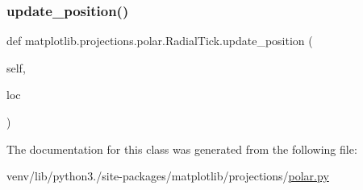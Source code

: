 \subsubsection{\texorpdfstring{update\+\_\+position()}{update\_position()}}
{\footnotesize\ttfamily def matplotlib.\+projections.\+polar.\+Radial\+Tick.\+update\+\_\+position (\begin{DoxyParamCaption}\item[{}]{self,  }\item[{}]{loc }\end{DoxyParamCaption})}



The documentation for this class was generated from the following file\+:\begin{DoxyCompactItemize}
\item 
venv/lib/python3./site-\/packages/matplotlib/projections/\hyperlink{polar_8py}{polar.\+py}\end{DoxyCompactItemize}
